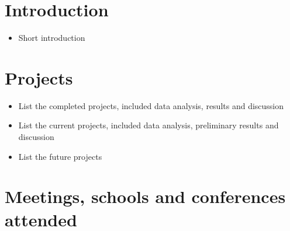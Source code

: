 \documentclass[useAMS,usenatbib,onecolumn]{mnras}
\begin{document}
\section{Introduction}
\label{sec:introduction}

\begin{itemize}
	\item{Short introduction}
\end{itemize}


\section{Projects}
\label{sec:projects}          

\begin{itemize}
	\item{List the completed projects, included data analysis, results and discussion}
	\item{List the current projects, included data analysis, preliminary results and discussion}
	\item{List the future projects}
\end{itemize}


\section{Meetings, schools and conferences attended}
\label{sec:meetings}    
\end{document}
